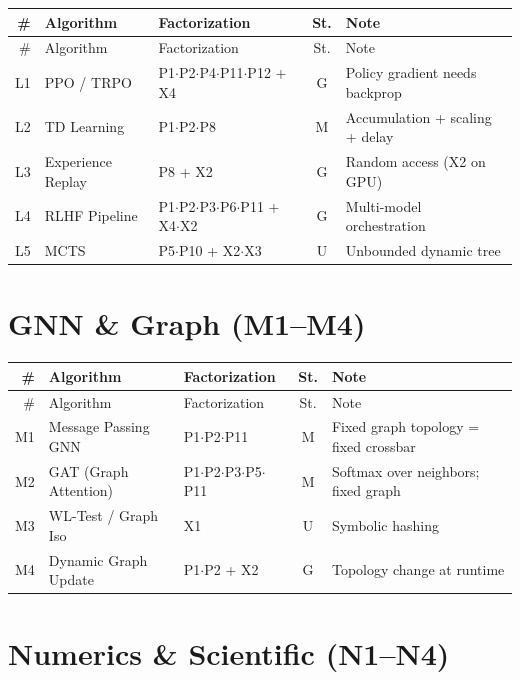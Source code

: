\documentclass[10pt]{article}
\begin{document}
\begin{longtable}{rlp{3.0cm}cp{4.8cm}}
\toprule
\# & Algorithm & Factorization & St. & Note \\
\midrule
\endfirsthead
\toprule
\# & Algorithm & Factorization & St. & Note \\
\midrule
\endhead
\bottomrule
\endfoot
L1 & PPO / TRPO & P1$\cdot$P2$\cdot$P4$\cdot$P11$\cdot$P12 + X4 & G & Policy gradient needs backprop \\
L2 & TD Learning & P1$\cdot$P2$\cdot$P8 & M & Accumulation + scaling + delay \\
L3 & Experience Replay & P8 + X2 & G & Random access (X2 on GPU) \\
L4 & RLHF Pipeline & P1$\cdot$P2$\cdot$P3$\cdot$P6$\cdot$P11 + X4$\cdot$X2 & G & Multi-model orchestration \\
L5 & MCTS & P5$\cdot$P10 + X2$\cdot$X3 & U & Unbounded dynamic tree \\
\end{longtable}

\section{GNN \& Graph (M1--M4)}

\begin{longtable}{rlp{3.0cm}cp{4.8cm}}
\toprule
\# & Algorithm & Factorization & St. & Note \\
\midrule
\endfirsthead
\toprule
\# & Algorithm & Factorization & St. & Note \\
\midrule
\endhead
\bottomrule
\endfoot
M1 & Message Passing GNN & P1$\cdot$P2$\cdot$P11 & M & Fixed graph topology = fixed crossbar \\
M2 & GAT (Graph Attention) & P1$\cdot$P2$\cdot$P3$\cdot$P5$\cdot$P11 & M & Softmax over neighbors; fixed graph \\
M3 & WL-Test / Graph Iso & X1 & U & Symbolic hashing \\
M4 & Dynamic Graph Update & P1$\cdot$P2 + X2 & G & Topology change at runtime \\
\end{longtable}

\section{Numerics \& Scientific (N1--N4)}
\end{document}
